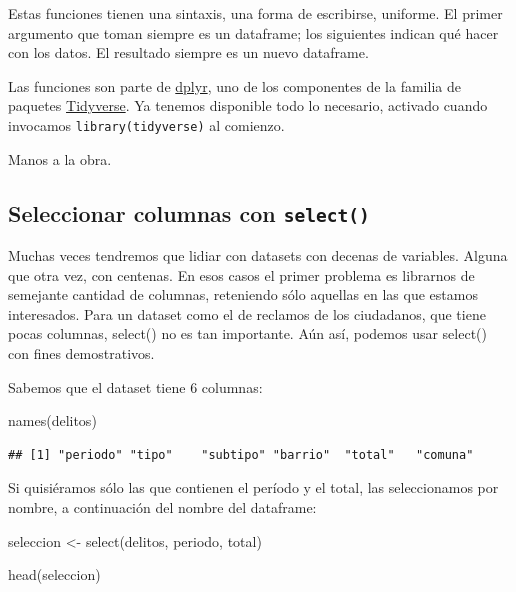 \documentclass[
]{book}
\newenvironment{Shaded}{\begin{snugshade}}{\end{snugshade}}
\newcommand{\FunctionTok}[1]{\textcolor[rgb]{0.00,0.00,0.00}{#1}}
\newcommand{\NormalTok}[1]{#1}
\newcommand{\OtherTok}[1]{\textcolor[rgb]{0.56,0.35,0.01}{#1}}
\begin{document}
Estas funciones tienen una sintaxis, una forma de escribirse, uniforme. El primer argumento que toman siempre es un dataframe; los siguientes indican qué hacer con los datos. El resultado siempre es un nuevo dataframe.

Las funciones son parte de \href{http://dplyr.tidyverse.org/}{dplyr}, uno de los componentes de la familia de paquetes \href{https://www.tidyverse.org/}{Tidyverse}. Ya tenemos disponible todo lo necesario, activado cuando invocamos \texttt{library(tidyverse)} al comienzo.

Manos a la obra.

\hypertarget{seleccionar-columnas-con-select}{%
\subsection{\texorpdfstring{Seleccionar columnas con \texttt{select()}}{Seleccionar columnas con select()}}\label{seleccionar-columnas-con-select}}

Muchas veces tendremos que lidiar con datasets con decenas de variables. Alguna que otra vez, con centenas. En esos casos el primer problema es librarnos de semejante cantidad de columnas, reteniendo sólo aquellas en las que estamos interesados. Para un dataset como el de reclamos de los ciudadanos, que tiene pocas columnas, select() no es tan importante. Aún así, podemos usar select() con fines demostrativos.

Sabemos que el dataset tiene 6 columnas:

\begin{Shaded}
\begin{Highlighting}[]
\FunctionTok{names}\NormalTok{(delitos)}
\end{Highlighting}
\end{Shaded}

\begin{verbatim}
## [1] "periodo" "tipo"    "subtipo" "barrio"  "total"   "comuna"
\end{verbatim}

Si quisiéramos sólo las que contienen el período y el total, las seleccionamos por nombre, a continuación del nombre del dataframe:

\begin{Shaded}
\begin{Highlighting}[]
\NormalTok{seleccion }\OtherTok{\textless{}{-}} \FunctionTok{select}\NormalTok{(delitos, periodo, total)}

\FunctionTok{head}\NormalTok{(seleccion)}
\end{Highlighting}
\end{Shaded}
\end{document}

